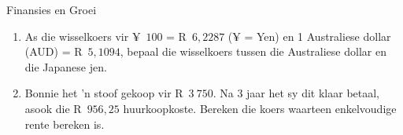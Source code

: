 \begin{eocexercises}{Finansies en Groei}
\begin{enumerate}[label=\textbf{\arabic*}.]
	\item As die wisselkoers vir ¥~$100$ = R~$6,2287$ (¥ = Yen) en 1 Australiese dollar (AUD) = R~$5,1094$, bepaal die wisselkoers
tussen die Australiese dollar en die Japanese jen.
	\item Bonnie het ’n stoof gekoop vir R~$3~750$. Na 3 jaar het sy dit klaar betaal, asook die R~$956,25$ huurkoopkoste.
Bereken die koers waarteen enkelvoudige rente bereken is.
    \end{enumerate}

\end{eocexercises}
